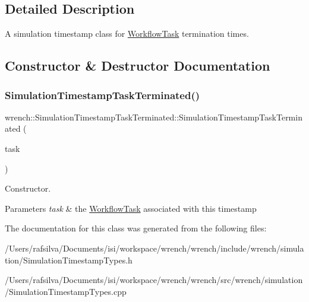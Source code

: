 \subsection{Detailed Description}
A simulation timestamp class for \hyperlink{classwrench_1_1_workflow_task}{Workflow\+Task} termination times. 

\subsection{Constructor \& Destructor Documentation}
\mbox{\label{classwrench_1_1_simulation_timestamp_task_terminated_a9a2914387e4cebfb299296f36d8f0efb}} 
\subsubsection{\texorpdfstring{Simulation\+Timestamp\+Task\+Terminated()}{SimulationTimestampTaskTerminated()}}
{\footnotesize\ttfamily wrench\+::\+Simulation\+Timestamp\+Task\+Terminated\+::\+Simulation\+Timestamp\+Task\+Terminated (\begin{DoxyParamCaption}\item[{\hyperlink{classwrench_1_1_workflow_task}{Workflow\+Task} $\ast$}]{task }\end{DoxyParamCaption})}



Constructor. 


\begin{DoxyParams}{Parameters}
{\em task} & the \hyperlink{classwrench_1_1_workflow_task}{Workflow\+Task} associated with this timestamp \\
\hline
\end{DoxyParams}


The documentation for this class was generated from the following files\+:\begin{DoxyCompactItemize}
\item 
/\+Users/rafsilva/\+Documents/isi/workspace/wrench/wrench/include/wrench/simulation/Simulation\+Timestamp\+Types.\+h\item 
/\+Users/rafsilva/\+Documents/isi/workspace/wrench/wrench/src/wrench/simulation/Simulation\+Timestamp\+Types.\+cpp\end{DoxyCompactItemize}
